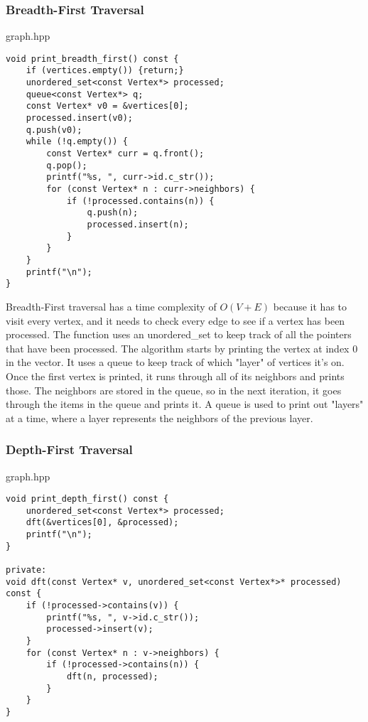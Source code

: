 \documentclass[letterpaper, 10pt,DIV=13]{scrartcl}
\numberwithin{equation}{section} %
\numberwithin{figure}{section} %
\numberwithin{table}{section} %
\begin{document}
\subsubsection{Breadth-First Traversal}

graph.hpp
\begin{verbatim}
void print_breadth_first() const {
    if (vertices.empty()) {return;}
    unordered_set<const Vertex*> processed;
    queue<const Vertex*> q;
    const Vertex* v0 = &vertices[0];
    processed.insert(v0);
    q.push(v0);
    while (!q.empty()) {
        const Vertex* curr = q.front();
        q.pop();
        printf("%s, ", curr->id.c_str());
        for (const Vertex* n : curr->neighbors) {
            if (!processed.contains(n)) {
                q.push(n);
                processed.insert(n);
            }
        }
    }
    printf("\n");
}
\end{verbatim}

Breadth-First traversal has a time complexity of $O(V + E)$ because it has to visit every vertex, and it
needs to check every edge to see if a vertex has been processed. The function uses an unordered\_set to
keep track of all the pointers that have been processed. The algorithm starts by printing the vertex at
index 0 in the vector. It uses a queue to keep track of which "layer" of vertices it's on. Once the first
vertex is printed, it runs through all of its neighbors and prints those. The neighbors are stored in the
queue, so in the next iteration, it goes through the items in the queue and prints it. A queue is used to
print out "layers" at a time, where a layer represents the neighbors of the previous layer.

\subsubsection{Depth-First Traversal}

graph.hpp
\begin{verbatim}
void print_depth_first() const {
    unordered_set<const Vertex*> processed;
    dft(&vertices[0], &processed);
    printf("\n");
}

private:
void dft(const Vertex* v, unordered_set<const Vertex*>* processed) const {
    if (!processed->contains(v)) {
        printf("%s, ", v->id.c_str());
        processed->insert(v);
    }
    for (const Vertex* n : v->neighbors) {
        if (!processed->contains(n)) {
            dft(n, processed);
        }
    }
}
\end{verbatim}
\end{document}
